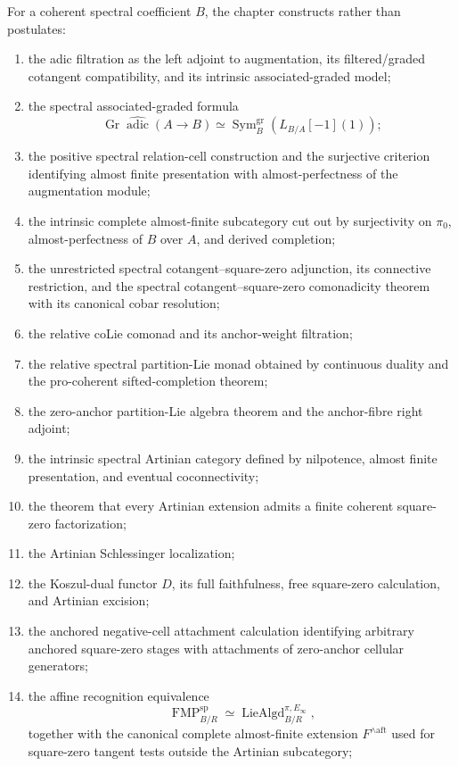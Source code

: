 For a coherent spectral coefficient $B$, the chapter constructs rather than
postulates:
\begin{enumerate}
    \item the adic filtration as the left adjoint to augmentation, its
    filtered/graded cotangent compatibility, and its intrinsic associated-graded model;
    \item the spectral associated-graded formula
    \[
        \operatorname{Gr}\widehat{\operatorname{adic}}(A\to B)
        \simeq
        \operatorname{Sym}^{\mathrm{gr}}_B
        (L_{B/A}[-1](1));
    \]
    \item the positive spectral relation-cell construction and the
    surjective criterion identifying almost finite presentation with
    almost-perfectness of the augmentation module;
    \item the intrinsic complete almost-finite subcategory cut out by
    surjectivity on $\pi_0$, almost-perfectness of $B$ over $A$, and derived
    completion;
    \item the unrestricted spectral cotangent--square-zero adjunction, its
    connective restriction, and the spectral cotangent--square-zero
    comonadicity theorem with its canonical cobar resolution;
    \item the relative coLie comonad and its anchor-weight filtration;
    \item the relative spectral partition-Lie monad obtained by continuous
    duality and the pro-coherent sifted-completion theorem;
    \item the zero-anchor partition-Lie algebra theorem and the anchor-fibre
    right adjoint;
    \item the intrinsic spectral Artinian category defined by nilpotence,
    almost finite presentation, and eventual coconnectivity;
    \item the theorem that every Artinian extension admits a finite coherent
    square-zero factorization;
    \item the Artinian Schlessinger localization;
    \item the Koszul-dual functor $D$, its full faithfulness, free
    square-zero calculation, and Artinian excision;
    \item the anchored negative-cell attachment calculation identifying
    arbitrary anchored square-zero stages with attachments of zero-anchor
    cellular generators;
    \item the affine recognition equivalence
    \[
        \operatorname{FMP}^{\mathrm{sp}}_{B/R}
        \simeq
        \operatorname{LieAlgd}^{\pi,E_\infty}_{B/R},
    \]
    together with the canonical complete almost-finite extension
    $F^{\wedge\mathrm{aft}}$ used for square-zero tangent tests outside the
    Artinian subcategory;
\end{enumerate}

